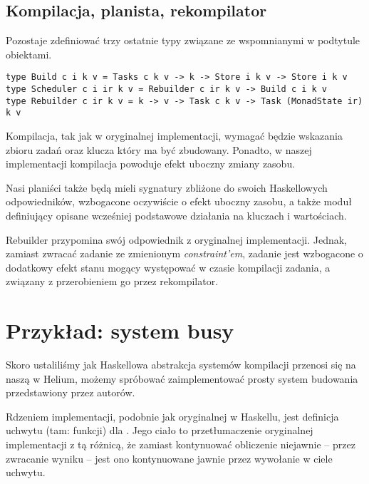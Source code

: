 \subsection{Kompilacja, planista, rekompilator}

Pozostaje zdefiniować trzy ostatnie typy związane ze wspomnianymi w podtytule obiektami.

\begin{lstlisting}[style=haskell-style]
type Build c i k v = Tasks c k v -> k -> Store i k v -> Store i k v
type Scheduler c i ir k v = Rebuilder c ir k v -> Build c i k v
type Rebuilder c ir k v = k -> v -> Task c k v -> Task (MonadState ir) k v
\end{lstlisting}

Kompilacja, tak jak w oryginalnej implementacji, wymagać będzie wskazania zbioru zadań oraz klucza który ma być zbudowany. Ponadto, w  naszej implementacji kompilacja powoduje efekt uboczny zmiany zasobu.

Nasi planiści także będą mieli sygnatury zbliżone do swoich Haskellowych odpowiedników, wzbogacone oczywiście o efekt uboczny zasobu, a także moduł definiujący opisane wcześniej podstawowe działania na kluczach i wartościach.



Rebuilder przypomina swój odpowiednik z oryginalnej implementacji. Jednak, zamiast zwracać zadanie ze zmienionym \textit{constraint'em}, zadanie jest wzbogacone o dodatkowy efekt stanu mogący występować w czasie kompilacji zadania, a związany z przerobieniem go przez rekompilator.

\section{Przykład: system busy}

Skoro ustaliliśmy jak Haskellowa abstrakcja systemów kompilacji przenosi się na naszą w Helium, możemy spróbować zaimplementować prosty system budowania  przedstawiony przez autorów.



Rdzeniem implementacji, podobnie jak oryginalnej w Haskellu, jest definicja uchwytu (tam: funkcji) dla . Jego ciało to przetłumaczenie oryginalnej implementacji z tą różnicą, że zamiast kontynuować obliczenie niejawnie -- przez zwracanie wyniku -- jest ono kontynuowane jawnie przez wywołanie  w ciele uchwytu.

